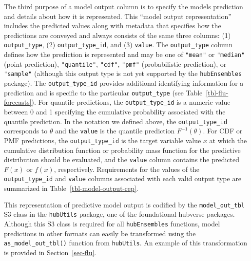 \documentclass[
]{article}
\begin{document}
The third purpose of a model output column is to specify the models
prediction and details about how it is represented. This ``model output
representation'' includes the predicted values along with metadata that
specifies how the predictions are conveyed and always consists of the
same three columns: (1) \texttt{output\_type}, (2)
\texttt{output\_type\_id}, and (3) \texttt{value}. The
\texttt{output\_type} column defines how the prediction is represented
and may be one of \texttt{"mean"} or \texttt{"median"} (point
prediction), \texttt{"quantile"}, \texttt{"cdf"}, \texttt{"pmf"}
(probabilistic prediction), or \texttt{"sample"} (although this output
type is not yet supported by the \texttt{hubEnsembles} package). The
\texttt{output\_type\_id} provides additional identifying information
for a prediction and is specific to the particular \texttt{output\_type}
(see Table~\ref{tbl-flu-forecasts}). For quantile predictions, the
\texttt{output\_type\_id} is a numeric value between 0 and 1 specifying
the cumulative probability associated with the quantile prediction. In
the notation we defined above, the \texttt{output\_type\_id} corresponds
to \(\theta\) and the \texttt{value} is the quantile prediction
\(F^{-1}(\theta)\). For CDF or PMF predictions, the
\texttt{output\_type\_id} is the target variable value \(x\) at which
the cumulative distribution function or probability mass function for
the predictive distribution should be evaluated, and the \texttt{value}
column contains the predicted \(F(x)\) or \(f(x)\), respectively.
Requirements for the values of the \texttt{output\_type\_id} and
\texttt{value} columns associated with each valid output type are
summarized in Table~\ref{tbl-model-output-rep}.

This representation of predictive model output is codified by the
\texttt{model\_out\_tbl} S3 class in the \texttt{hubUtils} package, one
of the foundational hubverse packages. Although this S3 class is
required for all \texttt{hubEnsembles} functions, model predictions in
other formats can easily be transformed using the
\texttt{as\_model\_out\_tbl()} function from \texttt{hubUtils}. An
example of this transformation is provided in Section~\ref{sec-flu}.
\end{document}
